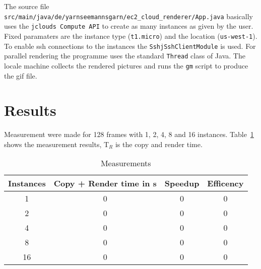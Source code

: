 \documentclass{article}
\begin{document}
The source file \texttt{src/\-main/\-java/\-de/\-yarnseemannsgarn/\-ec2\_cloud\_renderer/\-App.java} basically uses the \texttt{jclouds Compute API} to create as many instances as given by the user. Fixed paramaters are the instance type (\texttt{t1.micro}) and the location (\texttt{us-west-1}). To enable ssh connections to the instances the \texttt{Sshj\-Ssh\-Client\-Module} is used. For parallel rendering the programme uses the standard \texttt{Thread} class of Java. The locale machine collects the rendered pictures and runs the \texttt{gm} script to produce the gif file.


\section{Results}

Measurement were made for 128 frames with 1, 2, 4, 8 and 16 instances. Table~\ref{tab:measurements} shows the measurement results, T$_R$ is the copy and render time.

\begin{table}[htbp]
\centering
\begin{tabular}{ | c | c | c | c | }
\hline
\textbf{Instances} & \textbf{Copy + Render time} in s & \textbf{Speedup} & \textbf{Efficency} \\
\hline \hline
1 & 0 & 0 & 0 \\
\hline
2 & 0 & 0 & 0 \\
\hline
4 & 0 & 0 & 0 \\
\hline
8 & 0 & 0 & 0 \\
\hline
16 & 0 & 0 & 0 \\
\hline
\end{tabular}
\caption{Measurements}
\label{tab:measurements}
\end{table}


\end{document}
